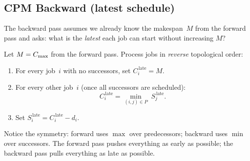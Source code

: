 \subsection{CPM Backward (latest schedule)}
\label{ssec:cpm-backward}

The backward pass assumes we already know the makespan~$M$ from
the forward pass and asks: what is the \emph{latest} each job can
start without increasing $M$?

\begin{definition}
\label{def:cpm-backward}
Let $M = C_{\max}$ from the forward pass.
Process jobs in \emph{reverse} topological order:
\begin{enumerate}[nosep]
  \item For every job~$i$ with no successors, set
        $C_i^{\,\text{late}} = M$.
  \item For every other job~$i$ (once all successors are
        scheduled):
        \[
          C_i^{\,\text{late}}
            = \min_{(i,j)\in P}\; S_j^{\,\text{late}}.
        \]
  \item Set $S_i^{\,\text{late}} = C_i^{\,\text{late}} - d_i$.
\end{enumerate}
\end{definition}

Notice the symmetry: forward uses $\max$ over predecessors;
backward uses $\min$ over successors.  The forward pass pushes
everything as early as possible; the backward pass pulls everything
as late as possible.

